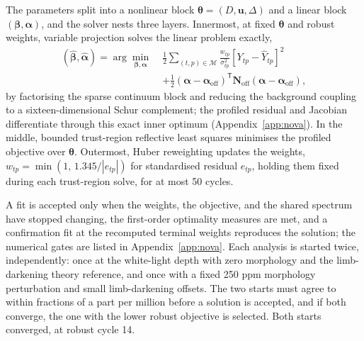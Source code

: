 
The parameters split into a nonlinear block
$\bm{\theta}=(D,\bm{u},\Delta)$ and a linear block
$(\bm{\beta},\bm{\alpha})$, and the solver nests three layers. Innermost,
at fixed $\bm{\theta}$ and robust weights, variable projection
\citep{GolubPereyra1973} solves the linear problem exactly,
\begin{equation}
\begin{split}
 (\widehat{\bm{\beta}},\widehat{\bm{\alpha}})=
 \arg\min_{\bm{\beta},\bm{\alpha}}\;
 &\frac{1}{2}\sum_{(t,p)\in\mathcal{M}}\frac{w_{tp}}{\sigma_{tp}^2}
 \left[Y_{tp}-\widehat Y_{tp}\right]^2 \\
 &+\frac{1}{2}(\bm{\alpha}-\bm{\alpha}_{\mathrm{off}})^{\mathsf T}
   \bm{N}_{\mathrm{off}}(\bm{\alpha}-\bm{\alpha}_{\mathrm{off}}),
\end{split}
 \label{eq:varpro}
\end{equation}
by factorising the sparse continuum block and reducing the background
coupling to a sixteen-dimensional Schur complement; the profiled residual
and Jacobian differentiate through this exact inner optimum
(Appendix~\ref{app:nova}). In the middle, bounded trust-region reflective
least squares \citep{BranchColemanLi1999} minimises the profiled
objective over $\bm{\theta}$. Outermost, Huber reweighting
\citep{Huber1964} updates the weights,
$w_{tp}=\min(1,\,1.345/|e_{tp}|)$ for standardised residual $e_{tp}$,
holding them fixed during each trust-region solve, for at most 50 cycles.

A fit is accepted only when the weights, the objective, and the shared
spectrum have stopped changing, the first-order optimality measures are
met, and a confirmation fit at the recomputed terminal weights
reproduces the solution; the numerical gates are listed in
Appendix~\ref{app:nova}. Each analysis is started twice, independently:
once at the white-light depth with zero morphology and the
limb-darkening theory reference, and once with a fixed 250 ppm
morphology perturbation and small limb-darkening offsets. The two starts
must agree to within fractions of a part per million before a solution
is accepted, and if both converge, the one with the lower robust
objective is selected. Both starts converged, at robust cycle 14.

